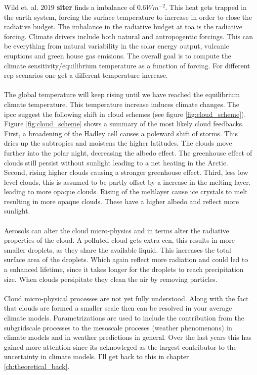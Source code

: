 Wild et. al. 2019  \textbf{siter} finds a imbalance of $0.6W m^{-2}$. This heat gets trapped in the earth system, forcing the surface temperature to increase in order to close the radiative budget. The imbalance in the radiative budget at \acrshort{toa} is the radiative forcing. Climate drivers include both natural and antropogentic forcings. This can be everything from natural variability in the solar energy output, vulcanic eruptions and green house gas emisions. The overall goal is to compute the climate sensitivity/equilibrium temperature as a function of forcing. For different \acrfull{rcp} scenarios one get a different temperature increase.
\\ \\ 
The global temperature will keep rising until we have reached the equilibrium climate temperature. This temperature increase induces climate changes. The \acrshort{ipcc} suggest the following shift in cloud schemes (see figure \ref{fig:cloud_scheme}). Figure \ref{fig:cloud_scheme} shows a summary of the most likely cloud feedbacks. First, a broadening of the Hadley cell causes a poleward shift of storms. This dries up the subtropics and moistens the higher latitudes. The clouds move further into the polar night, decreasing the albedo effect. 
The greenhouse effect of clouds still persist without sunlight leading to a net heating in the Arctic. Second, rising higher clouds causing a stronger greenhouse effect. Third, less low level clouds, this is assumed to be partly offset by a increase in the melting layer, leading to more opaque clouds. Rising of the meltlayer cause ice crystals to melt resulting in more opaque clouds. These have a higher albedo and reflect more sunlight. 
\\ \\
Aerosols can alter the cloud micro-physics and in terms alter the radiative properties of the cloud. A polluted cloud gets extra \acrshort{ccn}, this results in more smaller droplets, as they share the available liquid. This increases the total surface area of the droplets. Which again reflect more radiation and could led to a enhanced lifetime, since it takes longer for the droplets to reach precipitation size. %
When clouds persipitate they clean the air by removing particles.
\\ \\
Cloud micro-physical processes are not yet fully understood. Along with the fact that clouds are formed a smaller scale then can be resolved in your average climate models. Parametrizations are used to include the contribution from the subgridscale processes to the mesoscale proceses (weather phenomenons) in climate models and in weather predictions in general. Over the last years this has gained more attention since its acknowleged as the largest contributor to the uncertainty in climate models. I'll get back to this in chapter \ref{ch:theoretical_back}.

